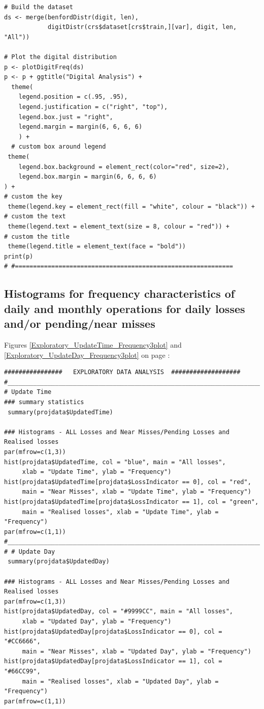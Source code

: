 \documentclass{DissertateUSU}
\begin{document}
\begin{verbatim}
# Build the dataset
ds <- merge(benfordDistr(digit, len),
            digitDistr(crs$dataset[crs$train,][var], digit, len, "All"))

# Plot the digital distribution
p <- plotDigitFreq(ds)
p <- p + ggtitle("Digital Analysis") +
  theme(
    legend.position = c(.95, .95),
    legend.justification = c("right", "top"),
    legend.box.just = "right",
    legend.margin = margin(6, 6, 6, 6)
    ) +
  # custom box around legend
 theme(
    legend.box.background = element_rect(color="red", size=2),
    legend.box.margin = margin(6, 6, 6, 6)
) +
# custom the key
 theme(legend.key = element_rect(fill = "white", colour = "black")) +
# custom the text
 theme(legend.text = element_text(size = 8, colour = "red")) +
# custom the title
 theme(legend.title = element_text(face = "bold"))
print(p)
# #============================================================
\end{verbatim}

\normalsize

\subsection{Histograms for frequency characteristics of daily and monthly operations for daily losses and/or pending/near misses}
\label{ssec:Frequency characteristics of operational activity}

Figures \ref{Exploratory_UpdateTime_Frequency3plot} and
\ref{Exploratory_UpdateDay_Frequency3plot} on page
\pageref{Exploratory_UpdateTime_Frequency3plot}:

\small

\begin{verbatim}
################   EXPLORATORY DATA ANALYSIS  ###################
#___________________________________________________________________________________________________
# Update Time
### summary statistics
 summary(projdata$UpdatedTime)

### Histograms - ALL Losses and Near Misses/Pending Losses and Realised losses 
par(mfrow=c(1,3))
hist(projdata$UpdatedTime, col = "blue", main = "All losses", 
     xlab = "Update Time", ylab = "Frequency")
hist(projdata$UpdatedTime[projdata$LossIndicator == 0], col = "red",
     main = "Near Misses", xlab = "Update Time", ylab = "Frequency")
hist(projdata$UpdatedTime[projdata$LossIndicator == 1], col = "green",
     main = "Realised losses", xlab = "Update Time", ylab = "Frequency")
par(mfrow=c(1,1))
#___________________________________________________________________________________________________
# # Update Day
 summary(projdata$UpdatedDay)

### Histograms - ALL Losses and Near Misses/Pending Losses and Realised losses
par(mfrow=c(1,3))
hist(projdata$UpdatedDay, col = "#9999CC", main = "All losses",
     xlab = "Updated Day", ylab = "Frequency")
hist(projdata$UpdatedDay[projdata$LossIndicator == 0], col = "#CC6666",
     main = "Near Misses", xlab = "Updated Day", ylab = "Frequency")
hist(projdata$UpdatedDay[projdata$LossIndicator == 1], col = "#66CC99",
     main = "Realised losses", xlab = "Updated Day", ylab = "Frequency")
par(mfrow=c(1,1))
\end{verbatim}
\end{document}
